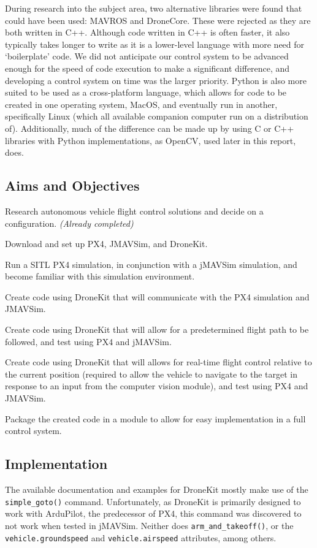 \documentclass[11pt,twoside]{article}
\begin{document}
During research into the subject area, two alternative libraries were found that could have been used: MAVROS and DroneCore. These were rejected as they are both written in C++. Although code written in C++ is often faster, it also typically takes longer to write as it is a lower-level language with more need for `boilerplate' code. We did not anticipate our control system to be advanced enough for the speed of code execution to make a significant difference, and developing a control system on time was the larger priority. Python is also more suited to be used as a cross-platform language, which allows for code to be created in one operating system, MacOS, and eventually run in another, specifically Linux (which all available companion computer run on a distribution of).
Additionally, much of the difference can be made up by using C or C++ libraries with Python implementations, as OpenCV, used later in this report, does.

\subsection{Aims and Objectives}
\begin{compactenum}
    \item Research autonomous vehicle flight control solutions and decide on a configuration. \emph{(Already completed)}
    \item Download and set up PX4, JMAVSim, and DroneKit.
    \item Run a SITL PX4 simulation, in conjunction with a jMAVSim simulation, and become familiar with this simulation environment.
    \item Create code using DroneKit that will communicate with the PX4 simulation and JMAVSim.
    \item Create code using DroneKit that will allow for a predetermined flight path to be followed, and test using PX4 and jMAVSim.
    \item Create code using DroneKit that will allows for real-time flight control relative to the current position (required to allow the vehicle to navigate to the target in response to an input from the computer vision module), and test using PX4 and JMAVSim.
    \item Package the created code in a module to allow for easy implementation in a full control system.
\end{compactenum}


\subsection{Implementation} \label{control_implementation}
The available documentation and examples for DroneKit mostly make use of the \lstinline|simple_goto()| command\cite{PX4_dev_guide}\cite{dronekit}. Unfortunately, as DroneKit is primarily designed to work with ArduPilot, the predecessor of PX4, this command was discovered to not work when tested in jMAVSim. Neither does \lstinline|arm_and_takeoff()|, or the \lstinline|vehicle.groundspeed| and \lstinline|vehicle.airspeed| attributes, among others.
\end{document}
